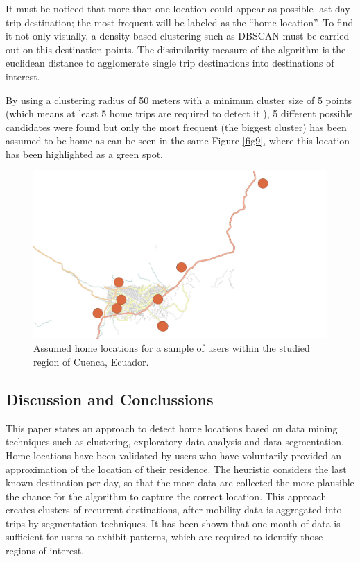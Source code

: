 \documentclass[]{elsarticle} %
\begin{document}
It must be noticed that more than one location could appear as possible
last day trip destination; the most frequent will be labeled as the
``home location''. To find it not only visually, a density based
clustering such as DBSCAN \citep{schubert2017dbscan} must be carried out
on this destination points. The dissimilarity measure of the algorithm
is the euclidean distance to agglomerate single trip destinations into
destinations of interest.

By using a clustering radius of 50 meters with a minimum cluster size of
5 points (which means at least 5 home trips are required to detect it ),
5 different possible candidates were found but only the most frequent
(the biggest cluster) has been assumed to be home as can be seen in the
same Figure \ref{fig9}, where this location has been highlighted as a
green spot.

\begin{figure}
\includegraphics[width=0.9\linewidth]{../paper/images/allhomes} \caption{\label{fig10}Assumed home locations for a sample of users within the studied region of Cuenca, Ecuador.}\label{fig:unnamed-chunk-12}
\end{figure}

\hypertarget{discussion-and-conclussions}{%
\subsection{Discussion and
Conclussions}\label{discussion-and-conclussions}}

This paper states an approach to detect home locations based on data
mining techniques such as clustering, exploratory data analysis and data
segmentation. Home locations have been validated by users who have
voluntarily provided an approximation of the location of their
residence. The heuristic considers the last known destination per day,
so that the more data are collected the more plausible the chance for
the algorithm to capture the correct location. This approach creates
clusters of recurrent destinations, after mobility data is aggregated
into trips by segmentation techniques. It has been shown that one month
of data is sufficient for users to exhibit patterns, which are required
to identify those regions of interest.
\end{document}
